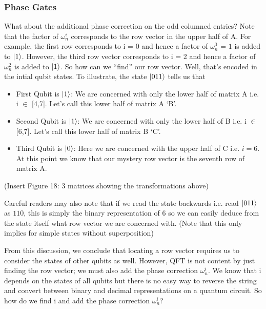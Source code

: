 \documentclass{article}
\newcommand{\om}{\omega_n}
\begin{document}
    \subsubsection{Phase Gates}
    What about the additional phase correction on the odd columned entries?
    Note that the factor of \(\om^i\) corresponds to the row vector in the
    upper half of A. For example, the first row corresponds to i = 0 and
    hence a factor of \(\om^0\) = \(1\) is added to \(\ket{1}\). However,
    the third row vector corresponds to i = 2 and hence a factor of
    \(\om^2\) is added to \(\ket{1}\).
    So how can we ``find'' our row vector. Well, that's encoded in the
    intial qubit states. To illustrate, the state \(\ket{011}\) tells
    us that
    \begin{itemize}
      \item First Qubit is \(\ket{1}\): We are concerned with only the lower
      half of matrix A i.e. i \(\in\) [4,7]. Let's call this lower half of
      matrix A `B'.
      \item Second Qubit is \(\ket{1}\): We are concerned with only the lower
      half of B i.e. i \(\in\) [6,7]. Let's call this lower half of matrix B
      `C'.
      \item Third Qubit is \(\ket{0}\): Here we are concerned with the upper
      half of C i.e. \(i = 6\). At this point we know that our mystery row
      vector is the seventh row of matrix A.

    \end{itemize}
    (Insert Figure 18: 3 matrices showing the transformations above)

    Careful readers may also note that if we read the state backwards i.e. read
    \(\ket{011}\) as \(110\), this is simply the binary representation of 6
    so we can easily deduce from the state itself what row vector we are
    concerned with. (Note that this only implies for simple states without
    superposition)

    From this discussion, we conclude that locating a row vector requires us
    to consider the states of other qubits as well. However, QFT is not content
    by just finding the row vector; we must also add the phase correction
    \(\om^i\). We know that i depends on the states of all qubits but there is
    no easy way to reverse the string and convert between binary and decimal
    representations on a quantum circuit. So how do we find i and add the
    phase correction \(\om^i\)?
\end{document}
